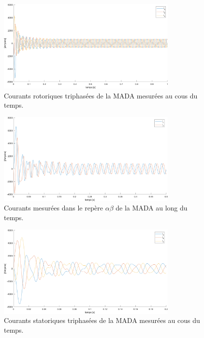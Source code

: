 \begin{figure}[!h]
    \centering
    \includegraphics[width=0.8\textwidth]{simusMATLAB/MADA/ir_abc.png} 
    \caption{Courants rotoriques triphasées de la MADA mesurées au cous du temps.}
    \label{img-simuMADA-ir_abc}
\end{figure}


\begin{figure}[!h]
    \centering
    \includegraphics[width=0.8\textwidth]{simusMATLAB/MADA/ir_alphabeta.png} 
    \caption{Courants mesurées dans le repère $\alpha\beta$ de la MADA au long du temps.}
    \label{img-simuMADA-ir_alphabeta}
\end{figure}


\begin{figure}[!h]
    \centering
    \includegraphics[width=0.8\textwidth]{simusMATLAB/MADA/is_abc.png} 
    \caption{Courants statoriques triphasées de la MADA mesurées au cous du temps.}
    \label{img-simuMADA-is_abc}
\end{figure}


